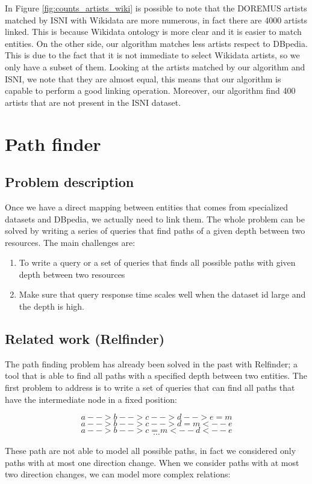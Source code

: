 \documentclass[paper=a4, fontsize=11pt]{scrartcl}
\newcommand{\textapprox}{\raisebox{0.5ex}{\texttildelow}}
\begin{document}
In Figure \ref{fig:counts_artists_wiki} is possible to note that the DOREMUS artists matched by ISNI with Wikidata are more numerous, in fact there are 4000 artists linked. This is because Wikidata ontology is more clear and it is easier to match entities.
On the other side, our algorithm matches less artists respect to DBpedia. This is due to the fact that it is not immediate to select Wikidata artists, so we only have a subset of them.
Looking at the artists matched by our algorithm and ISNI, we note that they are almost equal, this means that our algorithm is capable to perform a good linking operation. Moreover, our algorithm find \textapprox400 artists that are not present in the ISNI dataset.

\section{Path finder}
\subsection{Problem description}
Once we have a direct mapping between entities that comes from specialized datasets and DBpedia, we actually need to link them.
The whole problem can be solved by writing a series of queries that find paths of a given depth between two resources. 
The main challenges are:
\begin{enumerate}
\item To write a query or a set of queries that finds all possible paths with given depth between two resources
\item Make sure that query response time scales well when the dataset id large and the depth is high.
\end{enumerate}

\subsection{Related work (Relfinder)}
The path finding problem has already been solved in the past with Relfinder; a tool that is able to find all paths with a specified depth between two entities. 
The first problem to address is to write a set of queries that can find all paths that have the intermediate node in a fixed position:

$$a-->b-->c-->d-->e=m$$
$$a-->b-->c-->d=m<--e$$
$$a-->b-->c=m<--d<--e$$
$$\cdots$$

These path are not able to model all possible paths, in fact we considered only paths with at most one direction change.
When we consider paths with at most two direction changes, we can model more complex relations:
\end{document}
